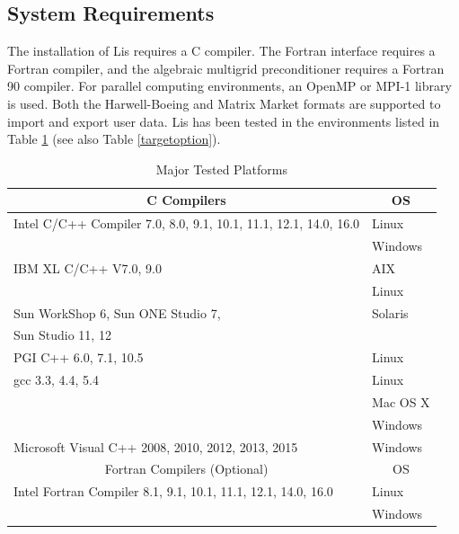 \documentclass[a4paper]{article}
\begin{document}
\subsection{System Requirements}
The installation of Lis requires a C compiler. The Fortran interface
requires a Fortran compiler, and the
algebraic multigrid preconditioner requires a Fortran 90 compiler.
For parallel computing environments, an OpenMP\cite{OpenMP} or 
MPI-1\cite{MPI} library is used\cite{kota1,kota2}.
Both the Harwell-Boeing\cite{duff92} and 
Matrix Market\cite{matrixmarket} formats are supported to import and
export user data. 
Lis has been tested in the environments listed in Table \ref{platforms}
(see also Table \ref{targetoption}). 

\begin{table}[htbp]
\caption{Major Tested Platforms}
\label{platforms}
\begin{center}
{\small
 \begin{tabular}{l|l}
\hline
\multicolumn{1}{c|}{C Compilers} & \multicolumn{1}{c}{OS} \\
\hline
Intel C/C++ Compiler 7.0, 8.0, 9.1, 10.1, 11.1, 12.1, 14.0, 16.0 & Linux \\
                                                     & Windows  \\
\hline
IBM XL C/C++ V7.0, 9.0                     & AIX     \\
                                           & Linux   \\
\hline
Sun WorkShop 6, Sun ONE Studio 7,          & Solaris \\
Sun Studio 11, 12                          &         \\
\hline
PGI C++ 6.0, 7.1, 10.5                     & Linux \\
\hline
gcc 3.3, 4.4, 5.4                          & Linux \\
                                           & Mac OS X \\
                                           & Windows \\
\hline
Microsoft Visual C++ 2008, 2010, 2012, 2013, 2015       & Windows \\
\hline
\hline
\multicolumn{1}{c|}{Fortran Compilers (Optional)} & \multicolumn{1}{c}{OS} \\
\hline
Intel Fortran Compiler 8.1, 9.1, 10.1, 11.1, 12.1, 14.0, 16.0 & Linux \\
                                                  & Windows  \\

\end{tabular}}
\end{center}
\end{table}
\end{document}
